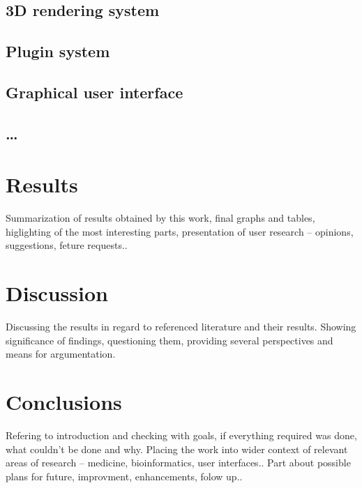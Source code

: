 \section{3D rendering system}
\section{Plugin system}
\section{Graphical user interface}
\section{\ldots}
\chapter{Results}
Summarization of results obtained by this work, final graphs and tables,
higlighting of the most interesting parts, presentation of user 
research -- opinions, suggestions,
feture requests..
\chapter{Discussion}
Discussing the results in regard to referenced literature and their results.
Showing significance of findings, questioning them, providing several
perspectives and means for argumentation.
\chapter{Conclusions}
Refering to introduction and checking with goals, if everything required was
done, what couldn't be done and why. Placing the work into wider context of
relevant areas of research -- medicine, bioinformatics, user interfaces..
Part about possible plans for future, improvment, enhancements, folow up..
